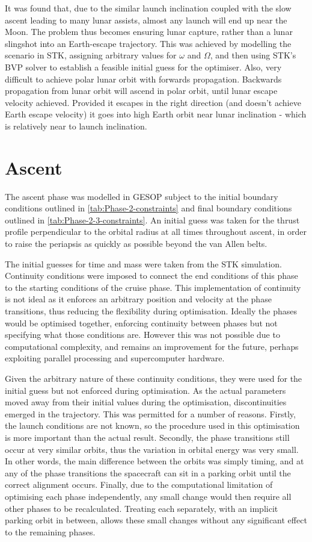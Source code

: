It was found that, due to the similar launch inclination coupled with the slow ascent leading to many lunar assists, almost any launch will end up near the Moon. The problem thus becomes ensuring lunar capture, rather than a lunar slingshot into an Earth-escape trajectory. This was achieved by modelling the scenario in STK, assigning arbitrary values for $\omega$ and $\Omega$, and then using STK's BVP solver to establish a feasible initial guess for the optimiser. 
Also, very difficult to achieve polar lunar orbit with forwards propagation. Backwards propagation from lunar orbit will ascend in polar orbit, until lunar escape velocity achieved. Provided it escapes in the right direction (and doesn't achieve Earth escape velocity) it goes into high Earth orbit near lunar inclination - which is relatively near to launch inclination.

\section{Ascent} 
The ascent phase was modelled in GESOP subject to the initial boundary conditions outlined in \autoref{tab:Phase-2-constraints} and final boundary conditions outlined in \autoref{tab:Phase-2-3-constraints}. An initial guess was taken for the thrust profile perpendicular to the orbital radius at all times throughout ascent, in order to raise the periapsis as quickly as possible beyond the van Allen belts.

The initial guesses for time and mass were taken from the STK simulation. Continuity conditions were imposed to connect the end conditions of this phase to the starting conditions of the cruise phase. This implementation of continuity is not ideal as it enforces an arbitrary position and velocity at the phase transitions, thus reducing the flexibility during optimisation. Ideally the phases would be optimised together, enforcing continuity between phases but not specifying what those conditions are. However this was not possible due to computational complexity, and remains an improvement for the future, perhaps exploiting parallel processing and supercomputer hardware.

Given the arbitrary nature of these continuity conditions, they were used for the initial guess but not enforced during optimisation. As the actual parameters moved away from their initial values during the optimisation, discontinuities emerged in the trajectory. This was permitted for a number of reasons. Firstly, the launch conditions are not known, so the procedure used in this optimisation is more important than the actual result. Secondly, the phase transitions still occur at very similar orbits, thus the variation in orbital energy was very small. In other words, the main difference between the orbits was simply timing, and at any of the phase transitions the spacecraft can sit in a parking orbit until the correct alignment occurs. Finally, due to the computational limitation of optimising each phase independently, any small change would then require all other phases to be recalculated. Treating each separately, with an implicit parking orbit in between, allows these small changes without any significant effect to the remaining phases.

